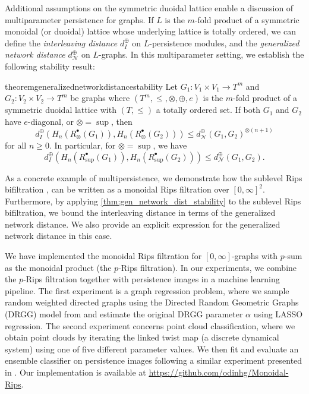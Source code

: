 \documentclass[a4paper,11pt]{article}
\newcommand{\tensor}{\otimes}
\newcommand{\atensor}{\oplus}
\theoremstyle{remark}
\begin{document}
Additional assumptions on the symmetric duoidal lattice enable a discussion of multiparameter persistence for graphs. If $L$ is the $m$-fold product of a symmetric monoidal (or duoidal) lattice whose underlying lattice is totally ordered, we can define the \emph{interleaving distance} $d_I^\atensor$ on $L$-persistence modules, and the \emph{generalized network distance} $d_\mathcal{N}^\atensor$ on $L$-graphs. In this multiparameter setting, we establish the following stability result:

\begin{restatable*}{theorem}{generalizednetworkdistancestability}\label{thm:gen_network_dist_stability}
Let $G_1\colon V_1\times V_1\to T^m$ and $G_2\colon V_2\times V_2\to T^m$ be graphs where $(T^m,\leq,\tensor,\atensor,e)$ is the $m$-fold product of a symmetric duoidal lattice with $(T,\leq)$ a totally ordered set. If both $G_1$ and $G_2$ have $e$-diagonal, or $\tensor=\sup$, then
\begin{equation*}
d_I^\atensor(H_n(R^\bullet_\tensor(G_1)), H_n(R^\bullet_\tensor(G_2)))\leq d_\mathcal{N}^\atensor(G_1,G_2)^{\tensor (n+1)}
\end{equation*}
for all $n\geq 0$. In particular, for $\tensor=\sup$, we have
\begin{equation*}
d_I^\atensor(H_n(R^\bullet_{\sup}(G_1)), H_n(R^\bullet_{\sup}(G_2)))\leq d_\mathcal{N}^\atensor(G_1,G_2).
\end{equation*}
\end{restatable*}
As a concrete example of multipersistence, we demonstrate how the sublevel Rips bifiltration \cite{botnan2022introduction,alonso2024probabilistic,lesnick2019lecture,lesnick2015theory}, can be written as a monoidal Rips filtration over $[0,\infty]^2$. Furthermore, by applying \cref{thm:gen_network_dist_stability} to the sublevel Rips bifiltration, we bound the interleaving distance in terms of the generalized network distance. We also provide an explicit expression for the generalized network distance in this case.

We have implemented the monoidal Rips filtration for $[0,\infty]$-graphs with $p$-sum as the monoidal product (the $p$-Rips filtration). In our experiments, we combine the $p$-Rips filtration together with persistence images \cite{adams2017} in a machine learning pipeline. The first experiment is a graph regression problem, where we sample random weighted directed graphs using the Directed Random Geometric Graphs (DRGG) model from \cite{michel2029} and  estimate the original DRGG parameter $\alpha$ using LASSO regression. The second experiment concerns point cloud classification, where we obtain point clouds by iterating the linked twist map (a discrete dynamical system) using one of five different parameter values. We then fit and evaluate an ensemble classifier on persistence images following a similar experiment presented in \cite{adams2017}. Our implementation is available at \url{https://github.com/odinhg/Monoidal-Rips}.
\end{document}

